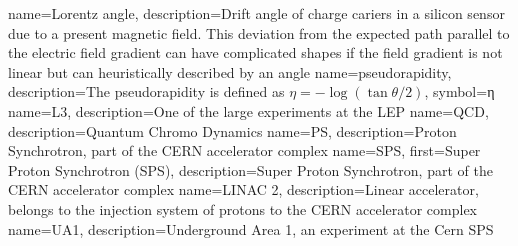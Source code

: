 
 { name={Lorentz angle}, description={Drift angle of charge cariers in a silicon sensor due to a present magnetic field. This deviation from the expected path parallel to the electric field gradient can have complicated shapes if the field gradient is not linear but can heuristically described by an angle}}
 { name={pseudorapidity}, description={The pseudorapidity is defined as $η=-\log(\tan{θ/2})$}, symbol={η} }
 { name={L3}, description={One of the large experiments at the LEP} }
 { name={QCD}, description={Quantum Chromo Dynamics} }
 { name={PS}, description={Proton Synchrotron, part of the CERN accelerator complex} }
 { name={SPS}, first={Super Proton Synchrotron (SPS)}, description={Super Proton Synchrotron, part of the CERN accelerator complex} }
 { name={LINAC 2}, description={Linear accelerator, belongs to the injection system of protons to the CERN accelerator complex} }
 { name={UA1}, description={Underground Area 1, an experiment at the Cern SPS}}

